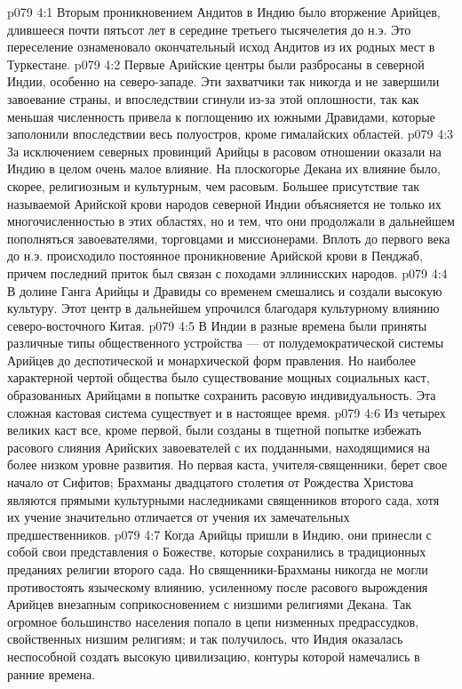 \vs p079 4:1 Вторым проникновением Андитов в Индию было вторжение Арийцев, длившееся почти пятьсот лет в середине третьего тысячелетия до н.э. Это переселение ознаменовало окончательный исход Андитов из их родных мест в Туркестане.
\vs p079 4:2 Первые Арийские центры были разбросаны в северной Индии, особенно на северо\hyp{}западе. Эти захватчики так никогда и не завершили завоевание страны, и впоследствии сгинули из\hyp{}за этой оплошности, так как меньшая численность привела к поглощению их южными Дравидами, которые заполонили впоследствии весь полуостров, кроме гималайских областей.
\vs p079 4:3 За исключением северных провинций Арийцы в расовом отношении оказали на Индию в целом очень малое влияние. На плоскогорье Декана их влияние было, скорее, религиозным и культурным, чем расовым. Большее присутствие так называемой Арийской крови народов северной Индии объясняется не только их многочисленностью в этих областях, но и тем, что они продолжали в дальнейшем пополняться завоевателями, торговцами и миссионерами. Вплоть до первого века до н.э. происходило постоянное проникновение Арийской крови в Пенджаб, причем последний приток был связан с походами эллинисских народов.
\vs p079 4:4 В долине Ганга Арийцы и Дравиды со временем смешались и создали высокую культуру. Этот центр в дальнейшем упрочился благодаря культурному влиянию северо\hyp{}восточного Китая.
\vs p079 4:5 В Индии в разные времена были приняты различные типы общественного устройства --- от полудемократической системы Арийцев до деспотической и монархической форм правления. Но наиболее характерной чертой общества было существование мощных социальных каст, образованных Арийцами в попытке сохранить расовую индивидуальность. Эта сложная кастовая система существует и в настоящее время.
\vs p079 4:6 Из четырех великих каст все, кроме первой, были созданы в тщетной попытке избежать расового слияния Арийских завоевателей с их подданными, находящимися на более низком уровне развития. Но первая каста, учителя\hyp{}священники, берет свое начало от Сифитов; Брахманы двадцатого столетия от Рождества Христова являются прямыми культурными наследниками священников второго сада, хотя их учение значительно отличается от учения их замечательных предшественников.
\vs p079 4:7 Когда Арийцы пришли в Индию, они принесли с собой свои представления о Божестве, которые сохранились в традиционных преданиях религии второго сада. Но священники\hyp{}Брахманы никогда не могли противостоять языческому влиянию, усиленному после расового вырождения Арийцев внезапным соприкосновением с низшими религиями Декана. Так огромное большинство населения попало в цепи низменных предрассудков, свойственных низшим религиям; и так получилось, что Индия оказалась неспособной создать высокую цивилизацию, контуры которой намечались в ранние времена.

